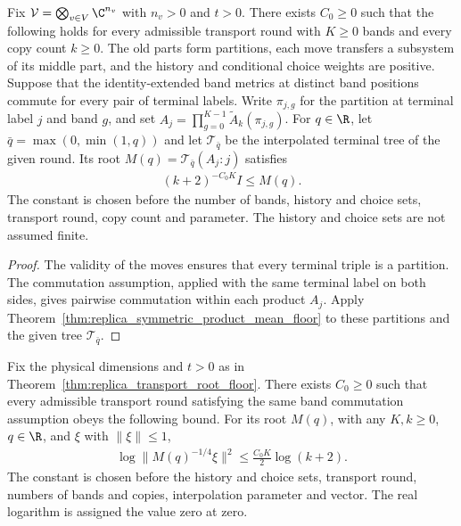 \begin{theorem}
    \label{thm:replica_transport_root_floor}
    \leanok
    Fix $\mathcal V=\bigotimes_{v\in V}\C^{n_v}$ with $n_v>0$ and $t>0$.
    There exists $C_0\ge0$ such that the following holds for every
    admissible transport round with $K\ge0$ bands and every copy count $k\ge0$.
    The old parts form partitions, each move transfers a subsystem of its
    middle part, and the history and conditional choice weights are positive.
    Suppose that the identity-extended band metrics at distinct band positions
    commute for every pair of terminal labels. Write $\pi_{j,g}$ for the
    partition at terminal label $j$ and band $g$, and set
    $A_j=\prod_{g=0}^{K-1}\widetilde A_k(\pi_{j,g})$.
    For $q\in\R$, let $\bar q=\max(0,\min(1,q))$ and let
    $\mathcal T_{\bar q}$ be the interpolated terminal tree of the given round.
    Its root $M(q)=\mathcal T_{\bar q}(A_j:j)$ satisfies
    \begin{align}
        (k+2)^{-C_0K}I\le M(q).
    \end{align}
    The constant is chosen before the number of bands, history and choice
    sets, transport round, copy count and parameter. The history and choice
    sets are not assumed finite.
\end{theorem}

\begin{proof}
    \leanok
    The validity of the moves ensures that every terminal triple is a
    partition. The commutation assumption, applied with the same terminal
    label on both sides, gives pairwise commutation within each product
    $A_j$. Apply Theorem~\ref{thm:replica_symmetric_product_mean_floor} to
    these partitions and the given tree $\mathcal T_{\bar q}$.
\end{proof}


\begin{theorem}
    \label{thm:replica_transport_root_log_norm}
    \leanok
    Fix the physical dimensions and $t>0$ as in
    Theorem~\ref{thm:replica_transport_root_floor}. There exists $C_0\ge0$
    such that every admissible transport round satisfying the same band
    commutation assumption obeys the following bound. For its root $M(q)$,
    with any $K,k\ge0$, $q\in\R$, and $\xi$ with $\|\xi\|\le1$,
    \begin{align}
        \log\|M(q)^{-1/4}\xi\|^2\le\frac{C_0K}{2}\log(k+2).
    \end{align}
    The constant is chosen before the history and choice sets, transport
    round, numbers of bands and copies, interpolation parameter and vector.
    The real logarithm is assigned the value zero at zero.
\end{theorem}

